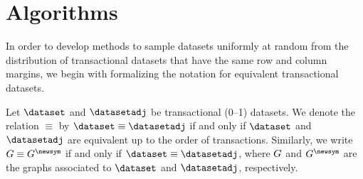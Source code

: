\newcommand{\graphsym}{G} %
\newcommand{\kttsnumdel}{\Delta\kttnumsym} %
\newcommand{\markchain}{\mathcal{Q}} %
\newcommand{\methas}{\texttt{metropolisHastings}} %
\newcommand{\methasrev}{\texttt{metropolisHastingsRevised}} %
\newcommand{\miningalgo}{\mathsf{A}} %
\newcommand{\naive}{\texttt{na\"{\i}ve}} %
\newcommand{\result}{\resultsym} %
\newcommand{\results}{\mathbf{\resultsym}} %
\newcommand{\resultsym}{X} %
\newcommand{\rnfi}[1]{RNFI(#1)} %
\newcommand{\selfloop}{\texttt{selfLoop}} %
\newcommand{\spairsgi}{Y} %
\newcommand{\spairsgieq}{\Phi} %
\newcommand{\spairsgieqelem}[1]{\phi_{#1}} %
\newcommand{\spairselem}[1]{g_{#1}} %
\newcommand{\statprobnew}{\statprob'} %
\newcommand{\tprobmatn}{\mathbf{\tprobmatnsym}} %
\newcommand{\tprobmatnsym}{P} %
\newcommand{\tprobmatnv}[2]{\tprobmatnsym_{#1, #2}} %
\newcommand{\tprobmato}{\mathbf{\tprobmatosym}} %
\newcommand{\tprobmatosym}{Q} %
\newcommand{\tprobmatov}[2]{\tprobmatosym_{#1, #2}} %
\newcommand{\transitions}{\mathcal{T}} %
\newcommand{\zstructsnumdel}{\Delta\zstructsnumsym} %
\section{Algorithms}

In order to develop methods to sample datasets uniformly at random from the
distribution of transactional datasets that have the same row and column
margins, we begin with formalizing the notation for equivalent transactional
datasets.

Let $\dataset$ and $\datasetadj$ be transactional (0--1) datasets. We denote
the relation $\equiv$ by $\dataset \equiv \datasetadj$ if and only if
$\dataset$ and $\datasetadj$ are equivalent up to the order of transactions.
Similarly, we write $\graph \equiv \graphadj$ if and only if $\dataset \equiv
\datasetadj$, where $\graph$ and $\graphadj$ are the graphs associated to
$\dataset$ and $\datasetadj$, respectively.

